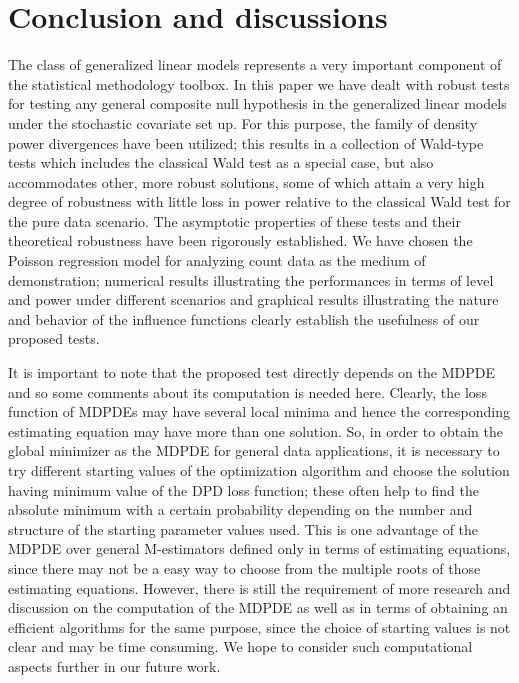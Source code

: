 \documentclass[a4paper]{article}%
\begin{document}



\section{Conclusion and discussions}

The class of generalized linear models represents a very important component of the statistical methodology toolbox. 
In this paper we have dealt with robust tests for testing any general composite null hypothesis 
in the generalized linear models  under the stochastic covariate set up. 
For this purpose, the family of density power divergences have been utilized; 
this results in a collection of Wald-type tests which includes the classical Wald test as a special case, 
but also accommodates other, more robust solutions, some of which attain a very high degree of robustness 
with little loss in power  relative to the classical Wald test for the pure data scenario. 
The asymptotic properties of these tests and their theoretical robustness have been rigorously established. 
We have chosen the Poisson regression model for analyzing count data as the medium of demonstration; 
numerical results illustrating the performances in terms of level and power under different scenarios 
and graphical results illustrating the nature and behavior of the influence functions 
clearly establish the usefulness of our proposed tests. 


It is important to note that the proposed test directly depends on the MDPDE
and so some comments about its computation is needed here.
Clearly, the loss function of MDPDEs may have several local minima and 
hence the corresponding estimating equation may have more than one solution. 
So, in order to obtain the global minimizer as the MDPDE for general data applications, 
it is necessary to try different starting values of the optimization algorithm 
and choose the solution having minimum value of the DPD loss function;
these often help  to find  the absolute minimum with a certain probability depending 
on the number and structure of the starting parameter values used. 
This is one advantage of the MDPDE over general M-estimators defined only in terms of estimating equations,
since there may not be a easy way to choose from the multiple roots of those estimating equations. 
However, there is still the requirement of more research and discussion on the computation  
of the MDPDE as well as in terms of obtaining an efficient algorithms for the same purpose,
since the choice of starting values is not clear and may be time consuming. 
We hope to consider such computational aspects further in our future work. 
\end{document}
